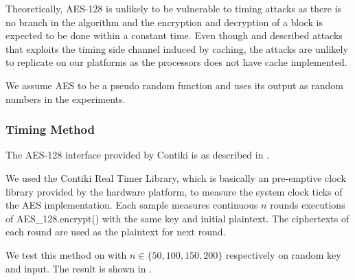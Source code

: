 Theoretically, AES-128 is unlikely to be vulnerable to timing attacks as there is no branch in the algorithm and the encryption and decryption of a block is expected to be done within a constant time. Even though \cite{Cache-Timing1} and \cite{Cache-Timing2} described attacks that exploits the timing side channel induced by caching, the attacks are unlikely to replicate on our platforms as the processors does not have cache implemented.

We assume AES to be a pseudo random function and uses its output as random numbers in the experiments.

\subsubsection{Timing Method}

The AES-128 interface provided by Contiki is as described in .

 

We used the Contiki Real Timer Library\cite{RTimer}, which is basically an pre-emptive clock library provided by the hardware platform, to measure the system clock ticks of the AES implementation. Each sample measures continuous $n$ rounds executions of AES\_128.encrypt() with the same key and initial plaintext. The ciphertexts of each round are used as the plaintext for next round.

We test this method on  with $n \in \{ 50, 100, 150, 200\}$ respectively on random key and input. The result is shown in .

